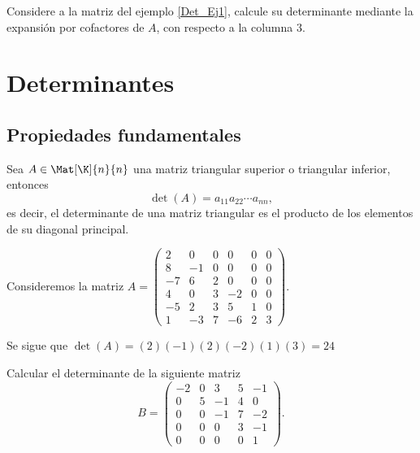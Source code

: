 \documentclass[compacto,10pt]{pubciencias-notas}
\begin{document}
    \begin{ejer}\hspace{0pt} Considere a la matriz del ejemplo \ref{Det_Ej1}, calcule su determinante mediante la expansión por cofactores de $A$, con respecto a la columna $3$.
\end{ejer}

\setcounter{section}{2}
\section{Determinantes}
\setcounter{subsection}{1}
\subsection{Propiedades fundamentales}

\begin{teo}
    Sea $A \in \Mat[\K]{n}{n}$ una matriz triangular superior o triangular inferior, entonces
    \[
        \det(A) = a_{11}a_{22} \cdots a_{nn},
    \]
    es decir, el determinante de una matriz triangular es el producto de los elementos de su diagonal principal.
\end{teo}

\begin{ejem}
    Consideremos la matriz
    $A = \begin{pmatrix}
    2 & 0 & 0 & 0 & 0 & 0 \\
    8 & -1 & 0 & 0 & 0 & 0 \\
    -7 & 6 & 2 & 0 & 0 & 0 \\
    4 & 0 & 3 & -2 & 0 & 0 \\
    -5 & 2 & 3 & 5 & 1 & 0 \\
    1 & -3 & 7 & -6 & 2 & 3
    \end{pmatrix}
    $.
    
    \noindent Se sigue que $\det(A) = (2)(-1)(2)(-2)(1)(3) = 24$
\end{ejem}

\begin{ejer}
    Calcular el determinante de la siguiente matriz
    \[
        B =
        \begin{pmatrix}
            -2 & 0 & 3 & 5 & -1 \\
            0 & 5 & -1 & 4 & 0 \\
            0 & 0 & -1 & 7 & -2 \\
            0 & 0 & 0 & 3 & -1 \\
            0 & 0 & 0 & 0 & 1
        \end{pmatrix}.
    \]
\end{ejer}
\end{document}

